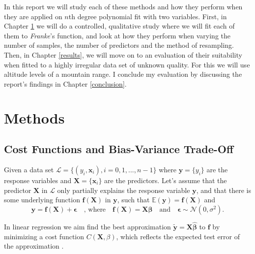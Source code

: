 \documentclass[]{article}
\begin{document}
In this report we will study each of these methods and how they perform when they are applied on $n$th degree polynomial fit with two variables. First, in Chapter \ref{methods} we will do a controlled, qualitative study where we will fit each of them to \textit{Franke}'s function, and look at how they perform when varying the number of samples, the number of predictors and the method of resampling. Then, in Chapter \ref{results}, we will move on to an evaluation of their suitability when fitted to a highly irregular data set of unknown quality. For this we will use altitude levels of a mountain range. I conclude my evaluation by discussing the report's findings in Chapter \ref{conclusion}.

\section{Methods} \label{methods}
\subsection{Cost Functions and Bias-Variance Trade-Off}

Given a data set $\mathcal{L} = \{(y_i, \mathbf{x}_i), i=0,1,...,n-1\}$ where $\mathbf{y} = \{y_i\}$ are the response variables and $\mathbf{X} = \{\mathbf{x}_i\}$ are the predictors. Let's assume that the predictor $\mathbf{X}$ in $\mathcal{L}$ only partially explains the response variable $\mathbf{y}$, and that there is some underlying function $\mathbf{f}(\mathbf{X})$ in $\mathbf{y}$, such that $\mathbb{E}(\mathbf{y}) = \mathbf{f}(\mathbf{X})$ and
\begin{equation}
\label{y_f_eps}
\mathbf{y} = \mathbf{f}(\mathbf{X}) + \mathbf{\epsilon} \quad \text{, where} \quad \mathbf{f}(\mathbf{X}) = \mathbf{X} \mathbf{\beta} \quad \text{and} \quad \mathbf{\epsilon} \sim \mathcal{N}(0, \sigma^2).
\end{equation}

In linear regression we aim find the best approximation $\mathbf{\tilde{y}} = \mathbf{X\hat{\beta}}$ to $\mathbf{f}$ by minimizing a cost function $C(\mathbf{X},\mathbb{\beta})$, which reflects the expected test error of the approximation \cite{james2013introduction}.
\end{document}
